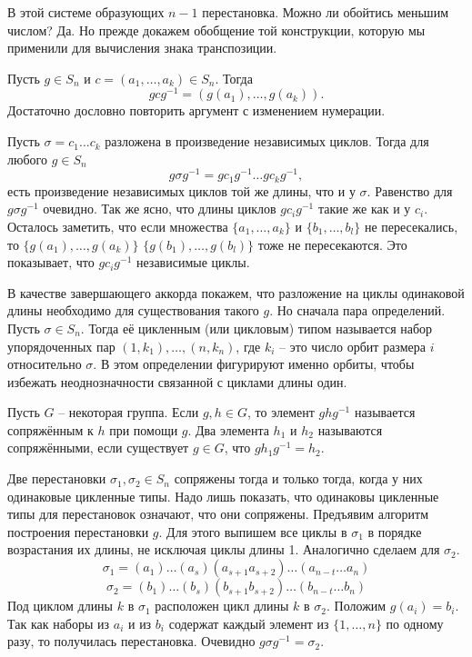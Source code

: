 В этой системе образующих $n-1$ перестановка. Можно ли обойтись меньшим числом? Да. Но прежде докажем обобщение той конструкции, которую мы применили для вычисления знака транспозиции.

\utv Пусть $g\in S_n$ и $c=(a_1,\dots,a_k)\in S_n$. Тогда 
$$gcg^{-1}=(g(a_1),\dots,g(a_k)).$$
\eutv
\proof Достаточно дословно повторить аргумент с изменением нумерации.
\endproof

\utv Пусть $\sigma=c_1\dots c_k$ разложена в произведение независимых циклов. Тогда для любого $g\in S_n$
$$g\sigma g^{-1}= gc_1 g^{-1}\dots gc_kg^{-1},$$
есть произведение независимых циклов той же длины, что и у $\sigma$.
\eutv
\proof Равенство для $g\sigma g^{-1}$ очевидно. Так же ясно, что длины циклов $gc_i g^{-1}$ такие же как и у $c_i$. Осталось заметить, что если множества $\{a_1,\dots,a_k\}$ и $\{b_1,\dots,b_l\}$ не пересекались, то $\{g(a_1),\dots,g(a_k)\}$ $\{g(b_1),\dots,g(b_l)\}$ тоже не пересекаются. Это показывает, что $gc_i g^{-1}$ независимые циклы.
\endproof

В качестве завершающего аккорда покажем, что разложение на циклы одинаковой длины необходимо для существования такого $g$. Но сначала пара определений.
\dfn Пусть $\sigma \in S_n$. Тогда её цикленным (или цикловым) типом называется набор упорядоченных пар $(1,k_1),\dots, (n,k_n)$, где $k_i$ -- это число орбит размера $i$ относительно $\sigma$. В этом определении фигурируют именно орбиты, чтобы избежать неоднозначности связанной с циклами длины один.
\edfn

\dfn Пусть $G$ -- некоторая группа. Если $g,h\in G$, то элемент $ghg^{-1}$ называется сопряжённым к $h$ при помощи $g$. Два элемента $h_1$ и $h_2$ называются сопряжёнными, если существует $g \in G$, что $gh_1g^{-1}=h_2$.
\edfn 

\thrm Две перестановки $\sigma_1,\sigma_2\in S_n$ сопряжены тогда и только тогда, когда у них одинаковые цикленные типы.
\ethrm
\proof Надо лишь показать, что одинаковы цикленные типы для перестановок означают, что они сопряжены. Предъявим алгоритм построения перестановки $g$. Для этого выпишем все циклы в $\sigma_1$ в порядке возрастания их длины, не исключая циклы длины 1. Аналогично сделаем для $\sigma_2$. 
$$\sigma_1=(a_1)\dots(a_s)(a_{s+1}a_{s+2})\dots (a_{n-t}\dots a_n)$$
$$\sigma_2=(b_1)\dots(b_s)(b_{s+1}b_{s+2})\dots (b_{n-t}\dots b_n)$$
Под циклом длины $k$ в $\sigma_1$ расположен цикл длины $k$ в $\sigma_2$. Положим $g(a_i)=b_i$. Так как наборы из $a_i$ и из $b_i$ содержат каждый элемент из $\{1,\dots,n\}$ по одному разу, то получилась перестановка. Очевидно $g\sigma g^{-1}=\sigma_2$.
\endproof

